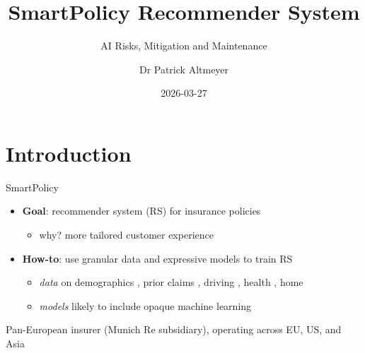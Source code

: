 \documentclass[
  ignorenonframetext,
]{beamer}
\title{\textbf{SmartPolicy} Recommender System}
\subtitle{AI Risks, Mitigation and Maintenance}
\author{Dr Patrick Altmeyer}
\date{2026-03-27}
\institute{Delft University of Technology}
\providecommand{\tightlist}{%
  \setlength{\itemsep}{0pt}\setlength{\parskip}{0pt}}
\begin{document}
\frame{\titlepage}


\section{Introduction}\label{introduction}

\begin{frame}{SmartPolicy}
\label{smartpolicy}
\begin{itemize}
\tightlist
\item
  \textbf{Goal}: recommender system (RS) for insurance policies

  \begin{itemize}
  \tightlist
  \item
    why? more tailored customer experience
  \end{itemize}
\item
  \textbf{How-to}: use granular data and expressive models to train RS

  \begin{itemize}
  \tightlist
  \item
    \emph{data} on demographics  , prior claims
    , driving , health ,
    home 
  \item
    \emph{models} likely to include opaque machine learning
  \end{itemize}
\end{itemize}

\begin{tcolorbox}[enhanced jigsaw, coltitle=black, opacityback=0, toprule=.15mm, breakable, left=2mm, rightrule=.15mm, titlerule=0mm, colframe=quarto-callout-tip-color-frame, opacitybacktitle=0.6, bottomtitle=1mm, toptitle=1mm, bottomrule=.15mm, title=\textcolor{quarto-callout-tip-color}{\faLightbulb}\hspace{0.5em}{ERGO context}, arc=.35mm, leftrule=.75mm, colback=white, colbacktitle=quarto-callout-tip-color!10!white]

Pan-European insurer (Munich Re subsidiary), operating across EU, US,
and Asia

\end{tcolorbox}
\end{frame}
\end{document}
